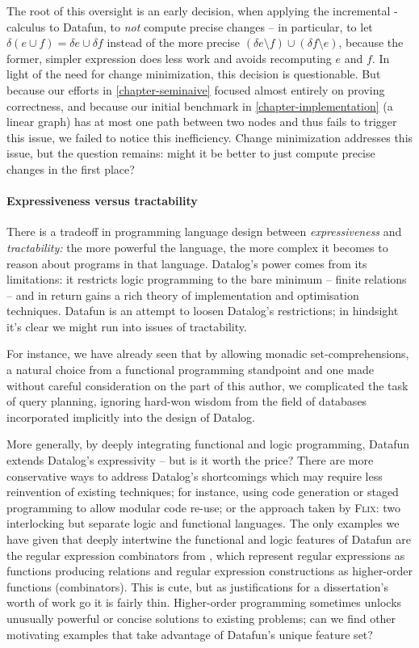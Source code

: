 The root of this oversight is an early decision, when applying the incremental
\fn-calculus to Datafun, to \emph{not} compute precise changes -- in particular,
to let $\delta(e \cup f) = \delta e \cup \delta f$ instead of the more precise
$(\delta e \setminus f) \cup (\delta f \setminus e)$, because the former,
simpler expression does less work and avoids recomputing $e$ and $f$. In light
of the need for change minimization, this decision is questionable. But because
our efforts in \cref{chapter-seminaive} focused almost entirely on proving
correctness, and because our initial benchmark in \cref{chapter-implementation}
(a linear graph) has at most one path between two nodes and thus fails to
trigger this issue, we failed to notice this inefficiency.
%
Change minimization addresses this issue, but the question remains: might it be
better to just compute precise changes in the first place?

\paragraph{Expressiveness versus tractability}

There is a tradeoff in programming language design between
\emph{expressiveness} and \emph{tractability:} the more powerful the language,
the more complex it becomes to reason about programs in that language.
%
Datalog's power comes from its limitations: it restricts logic programming to
the bare minimum -- finite relations -- and in return gains a rich theory of
implementation and optimisation techniques. Datafun is an attempt to loosen
Datalog's restrictions; in hindsight it's clear we might run into issues of
tractability.

For instance, we have already seen that by allowing monadic set-comprehensions, a natural choice from a functional programming standpoint and one made without careful consideration on the part of this author, we complicated the task of query planning, ignoring hard-won wisdom from the field of databases incorporated implicitly into the design of Datalog.

More generally, by deeply integrating functional and logic programming, Datafun
extends Datalog's expressivity -- but is it worth the price? There are more
conservative ways to address Datalog's shortcomings which may require less
reinvention of existing techniques; for instance, using code generation or
staged programming to allow modular code re-use; or the approach taken by
\textsc{Flix}: two interlocking but separate logic and functional languages.
%
The only examples we have given that deeply intertwine the functional and logic
features of Datafun are the regular expression combinators from
, which
represent regular expressions as functions producing relations and regular
expression constructions as higher-order functions (combinators).
%
This is cute, but as justifications for a dissertation's worth of work go it is
fairly thin.
%
Higher-order programming sometimes unlocks unusually powerful or concise
solutions to existing problems; can we find other motivating examples that take
advantage of Datafun's unique feature set?

